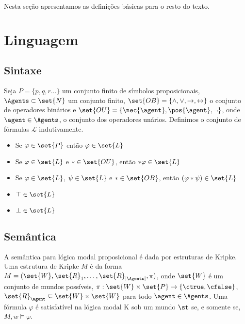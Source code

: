 Nesta seção apresentamos as definições básicas para o resto do texto.

\section{Linguagem}
\subsection{Sintaxe}
Seja $P = \{p, q, r \dots\}$ um conjunto finito de símbolos proposicionais, $\Agents \subset \set{N}$ um conjunto finito, $\set{OB} = \{\land, \lor, \rightarrow, \leftrightarrow \}$ o conjunto de operadores binários e $\set{OU} = \{\nec{\agent}, \pos{\agent}, \neg \}$, onde $\agent \in \Agents$, o conjunto dos operadores unários. Definimos o conjunto de fórmulas $\mathcal{L}$ indutivamente.

\begin{itemize}
\item Se $\varphi \in \set{P}$ então $\varphi \in \set{L}$
\item Se $\varphi \in \set{L}$ e $* \in \set{OU}$, então $* \varphi \in \set{L}$
\item Se $\varphi \in \set{L}$, $\psi \in \set{L}$ e $* \in \set{OB}$, então $(\varphi * \psi) \in \set{L}$
\item $\top \in \set{L}$
\item $\bot \in \set{L}$
\end{itemize}

\subsection{Semântica}
A semântica para lógica modal proposicional é dada por estruturas de Kripke. Uma estrutura de Kripke $M$ é da forma $M = (\set{W}, \set{R}_1, \ldots, \set{R}_{|\Agents|}, \pi)$, onde %
$\set{W}$ é um conjunto de mundos possíveis, $\pi:\set{W} \times \set{P} \rightarrow \{\ctrue, \cfalse\}$, $\set{R}_\agent \subseteq \set{W} \times \set{W}$ para todo $\agent \in \Agents$. Uma fórmula $\varphi$ é satisfatível na lógica modal K sob um mundo $\st$ se, e somente se, $M,w \models \varphi$.

